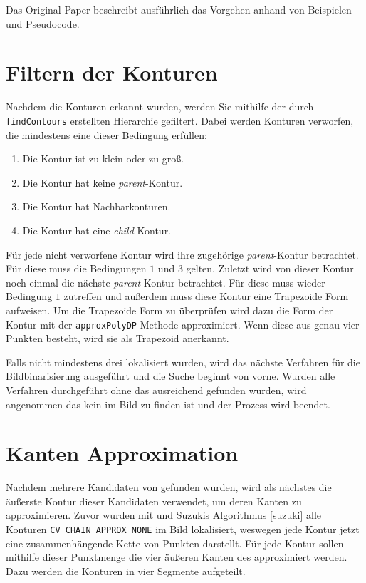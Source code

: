 Das Original Paper \cite{journals/cvgip/SuzukiA85} beschreibt ausführlich das Vorgehen anhand von Beispielen und Pseudocode.

\section{Filtern der Konturen}
Nachdem die Konturen erkannt wurden, werden Sie mithilfe der durch \texttt{findContours} erstellten Hierarchie gefiltert. Dabei werden Konturen verworfen, die mindestens eine dieser Bedingung erfüllen:
\begin{enumerate}
	\item Die Kontur ist zu klein oder zu groß.
	\item Die Kontur hat keine \emph{parent}-Kontur.
	\item Die Kontur hat Nachbarkonturen.
	\item Die Kontur hat eine \emph{child}-Kontur.
\end{enumerate}
Für jede nicht verworfene Kontur wird ihre zugehörige \emph{parent}-Kontur betrachtet. Für diese muss die Bedingungen $1$ und $3$ gelten.
Zuletzt wird von dieser Kontur noch einmal die nächste \emph{parent}-Kontur betrachtet. Für diese muss wieder Bedingung $1$ zutreffen und außerdem muss diese Kontur eine Trapezoide Form aufweisen.
Um die Trapezoide Form zu überprüfen wird dazu die Form der Kontur mit der \texttt{approxPolyDP} Methode approximiert. Wenn diese aus genau vier Punkten besteht, wird sie als Trapezoid anerkannt.

Falls nicht mindestens drei \fps lokalisiert wurden, wird das nächste Verfahren für die Bildbinarisierung ausgeführt und die Suche beginnt von vorne. Wurden alle Verfahren durchgeführt ohne das ausreichend \fps gefunden wurden, wird angenommen das kein \QRCode im Bild zu finden ist und der Prozess wird beendet.

\section{Kanten Approximation}
Nachdem mehrere Kandidaten von \fps gefunden wurden, wird als nächstes die äußerste Kontur dieser Kandidaten verwendet, um deren Kanten zu approximieren. Zuvor wurden mit \OpenCV und Suzukis Algorithmus \ref{suzuki} alle Konturen \texttt{CV\_CHAIN\_APPROX\_NONE} im Bild lokalisiert, weswegen jede Kontur jetzt eine zusammenhängende Kette von Punkten darstellt. Für jede Kontur sollen mithilfe dieser Punktmenge die vier äußeren Kanten des \fps approximiert werden. Dazu werden die Konturen in vier Segmente aufgeteilt.

